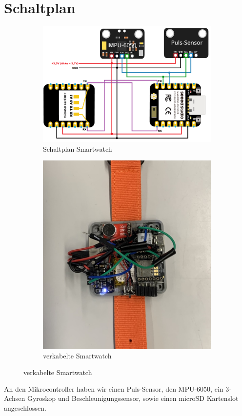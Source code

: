 \documentclass[a4paper, 11pt]{article}
\begin{document}
\section{Schaltplan}
\begin{figure}[H]
    \centering
    \begin{subfigure}{0.64\textwidth}
        \centering
        \includegraphics[width=\textwidth]{images/Schaltplan_v1.png}
        \caption{Schaltplan Smartwatch}
        \label{fig:Schaltplan Smartwatch}
    \end{subfigure}
    \begin{subfigure}{0.34\textwidth}
        \centering
        \includegraphics[width=\textwidth]{images/verkabelte_Smartwatch_cropped.JPEG}
        \caption{verkabelte Smartwatch}
        \label{fig:verkabelte Smartwatch}
    \end{subfigure}
\end{figure}
An den Mikrocontroller haben wir einen Puls-Sensor, den MPU-6050, ein 3-Achsen Gyroskop und Beschleunigungssensor, sowie einen microSD Kartenslot angeschlossen.
\end{document}
